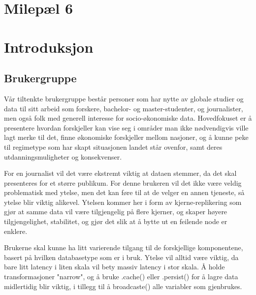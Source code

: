 \section{Milepæl 6}

\section{Introduksjon}

\subsection{Brukergruppe}
Vår tiltenkte brukergruppe består personer som har nytte av globale studier og data til sitt arbeid som forskere, bachelor- og master-studenter, og journalister, men også folk med generell interesse for socio-økonomiske data. Hovedfokuset er å presentere hvordan forskjeller kan vise seg i områder man ikke nødvendigvis ville lagt merke til det, finne økonomiske forskjeller mellom nasjoner, og å kunne peke til regimetype som har skapt situasjonen landet står ovenfor, samt deres utdanningsmuligheter og konsekvenser.

For en journalist vil det være ekstremt viktig at dataen stemmer, da det skal presenteres for et større publikum. For denne brukeren vil det ikke være veldig problematisk med ytelse, men det kan føre til at de velger en annen tjeneste, så ytelse blir viktig alikevel. Ytelsen kommer her i form av kjerne-replikering som gjør at samme data vil være tilgjengelig på flere kjerner, og skaper høyere tilgjengelighet, stabilitet, og gjør det slik at å bytte ut en feilende node er enklere.

Brukerne skal kunne ha litt varierende tilgang til de forskjellige komponentene, basert på hvilken databasetype som er i bruk. Ytelse vil alltid være viktig, da bare litt latency i liten skala vil bety massiv latency i stor skala. Å holde transformasjoner "narrow", og å bruke .cache() eller .persist() for å lagre data midlertidig blir viktig, i tillegg til å broadcaste() alle variabler som gjenbrukes.




